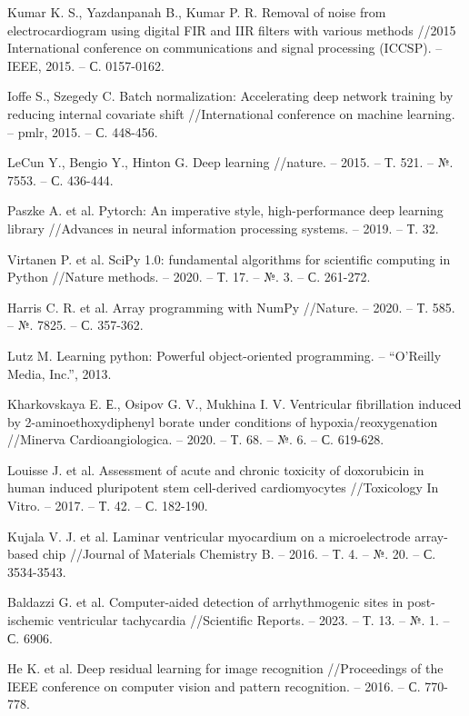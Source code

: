 \begin{thebibliography}{00}
	Kumar K. S., Yazdanpanah B., Kumar P. R. Removal of noise from
	electrocardiogram using digital FIR and IIR filters with various methods
	//2015 International conference on communications and signal processing
	(ICCSP). – IEEE, 2015. – С. 0157-0162.

	Ioffe S., Szegedy C. Batch normalization: Accelerating deep network
	training by reducing internal covariate shift //International conference on
	machine learning. – pmlr, 2015. – С. 448-456.

	LeCun Y., Bengio Y., Hinton G. Deep learning //nature. – 2015. – Т. 521. –
	№. 7553. – С. 436-444.

	Paszke A. et al. Pytorch: An imperative style, high-performance deep
	learning library //Advances in neural information processing systems. –
	2019. – Т. 32.

	Virtanen P. et al. SciPy 1.0: fundamental algorithms for scientific
	computing in Python //Nature methods. – 2020. – Т. 17. – №. 3. – С.
	261-272.

	Harris C. R. et al. Array programming with NumPy //Nature. – 2020. – Т.
	585. – №. 7825. – С. 357-362.

	Lutz M. Learning python: Powerful object-oriented programming. – ``O'Reilly
	Media, Inc.'', 2013.

	Kharkovskaya E. Е., Osipov G. V., Mukhina I. V. Ventricular fibrillation
	induced by 2-aminoethoxydiphenyl borate under conditions of
	hypoxia/reoxygenation //Minerva Cardioangiologica. – 2020. – Т. 68. – №. 6.
	– С. 619-628.

	Louisse J. et al. Assessment of acute and chronic toxicity of doxorubicin
	in human induced pluripotent stem cell-derived cardiomyocytes //Toxicology
	In Vitro. – 2017. – Т. 42. – С. 182-190.

	Kujala V. J. et al. Laminar ventricular myocardium on a microelectrode
	array-based chip //Journal of Materials Chemistry B. – 2016. – Т. 4. – №.
	20. – С. 3534-3543.

	Baldazzi G. et al. Computer-aided detection of arrhythmogenic sites in
	post-ischemic ventricular tachycardia //Scientific Reports. – 2023. – Т.
	13. – №. 1. – С. 6906.

	He K. et al. Deep residual learning for image recognition //Proceedings of
	the IEEE conference on computer vision and pattern recognition. – 2016. –
	С. 770-778.


\end{thebibliography}
